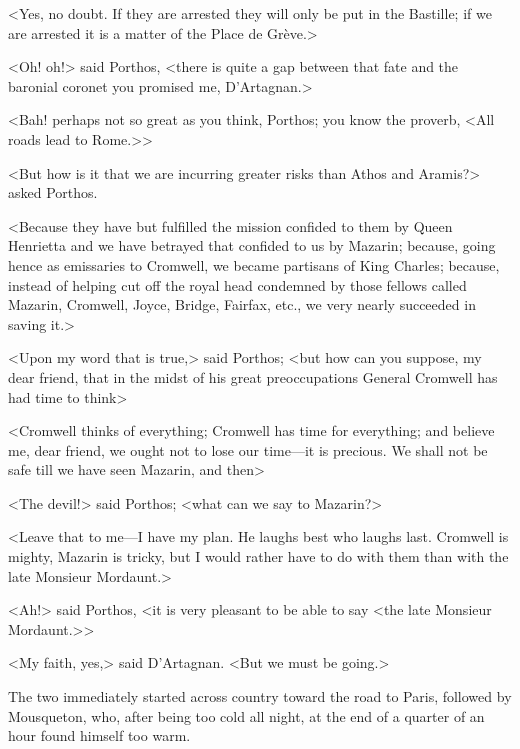 <Yes, no doubt. If they are arrested they will only be put in the Bastille; if we are arrested it is a matter of the Place de Grève.>

<Oh! oh!> said Porthos, <there is quite a gap between that fate and the baronial coronet you promised me, D'Artagnan.>

<Bah! perhaps not so great as you think, Porthos; you know the proverb, <All roads lead to Rome.>>

<But how is it that we are incurring greater risks than Athos and Aramis?> asked Porthos.

<Because they have but fulfilled the mission confided to them by Queen Henrietta and we have betrayed that confided to us by Mazarin; because, going hence as emissaries to Cromwell, we became partisans of King Charles; because, instead of helping cut off the royal head condemned by those fellows called Mazarin, Cromwell, Joyce, Bridge, Fairfax, etc., we very nearly succeeded in saving it.>

<Upon my word that is true,> said Porthos; <but how can you suppose, my dear friend, that in the midst of his great preoccupations General Cromwell has had time to think\longdash>

<Cromwell thinks of everything; Cromwell has time for everything; and believe me, dear friend, we ought not to lose our time—it is precious. We shall not be safe till we have seen Mazarin, and then\longdash>

<The devil!> said Porthos; <what can we say to Mazarin?>

<Leave that to me—I have my plan. He laughs best who laughs last. Cromwell is mighty, Mazarin is tricky, but I would rather have to do with them than with the late Monsieur Mordaunt.>

<Ah!> said Porthos, <it is very pleasant to be able to say <the late Monsieur Mordaunt.>>

<My faith, yes,> said D'Artagnan. <But we must be going.>

The two immediately started across country toward the road to Paris, followed by Mousqueton, who, after being too cold all night, at the end of a quarter of an hour found himself too warm. 